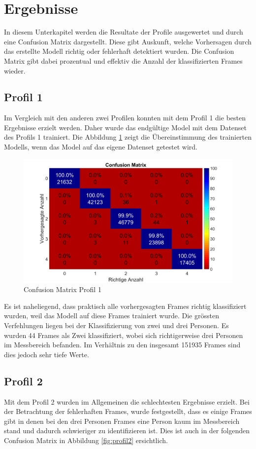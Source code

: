 \section{Ergebnisse}
\label{sec:Ergebnisse}

In diesem Unterkapitel werden die Resultate der Profile ausgewertet und durch eine Confusion Matrix dargestellt. Diese gibt Auskunft, welche Vorhersagen durch das erstellte Modell richtig oder fehlerhaft detektiert wurden. Die Confusion Matrix gibt dabei prozentual und effektiv die Anzahl der klassifizierten Frames wieder. 


\subsection{Profil 1}
\label{subsec:Profil1}
Im Vergleich mit den anderen zwei Profilen konnten mit dem Profil 1 die besten Ergebnisse erzielt werden. Daher wurde das endgültige Model mit dem Datenset des Profils 1 trainiert. Die Abbildung \ref{fig:profil1} zeigt die Übereinstimmung des trainierten Modells, wenn das Model auf das eigene Datenset getestet wird. 


\begin{figure}[H]
	\centering
	\includegraphics[width=0.55\linewidth]{fig/Profil_1m}
	\caption[Confusion Matrix Profil 1]{Confusion Matrix Profil 1}
		\label{fig:profil1}

\end{figure}

 Es ist naheliegend, dass praktisch alle vorhergesagten Frames richtig klassifiziert wurden, weil das Modell auf diese Frames trainiert wurde. Die grössten Verfehlungen liegen bei der Klassifizierung von zwei und drei Personen. Es wurden 44 Frames als Zwei klassifiziert, wobei sich richtigerweise drei Personen im Messbereich befanden. Im Verhältnis zu den insgesamt 151935 Frames sind dies jedoch sehr tiefe Werte.

\subsection{Profil 2}
\label{subsec:Profil2}
Mit dem Profil 2 wurden im Allgemeinen die schlechtesten Ergebnisse erzielt. Bei der Betrachtung der fehlerhaften Frames, wurde festgestellt, dass es einige Frames gibt in denen bei den drei Personen Frames eine Person kaum im Messbereich stand und dadurch schwieriger zu identifizieren ist. Dies ist auch in der folgenden Confusion Matrix in Abbildung \ref{fig:profil2} ersichtlich.

